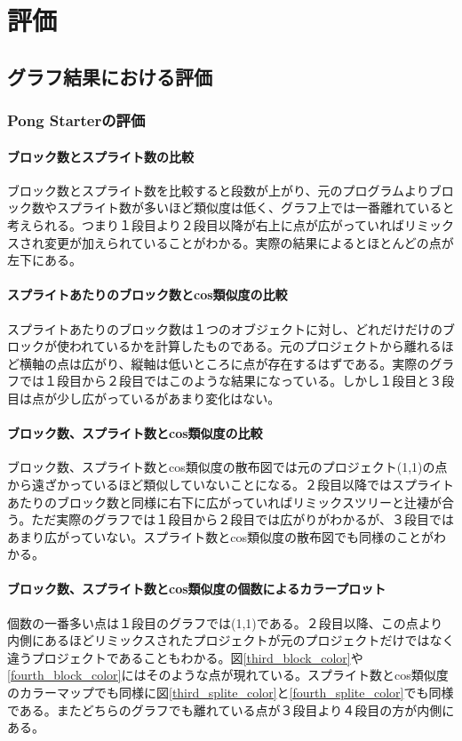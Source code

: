 \documentclass[a4paper,10pt,onecolumn,oneside,openany]{jsbook}
\begin{document}
 




\chapter{評価}

\section{グラフ結果における評価}
\subsection{Pong Starterの評価}
\subsubsection{ブロック数とスプライト数の比較}
ブロック数とスプライト数を比較すると段数が上がり、元のプログラムよりブロック数やスプライト数が多いほど類似度は低く、グラフ上では一番離れていると考えられる。つまり１段目より２段目以降が右上に点が広がっていればリミックスされ変更が加えられていることがわかる。実際の結果によるとほとんどの点が左下にある。

\subsubsection{スプライトあたりのブロック数とcos類似度の比較}
スプライトあたりのブロック数は１つのオブジェクトに対し、どれだけだけのブロックが使われているかを計算したものである。元のプロジェクトから離れるほど横軸の点は広がり、縦軸は低いところに点が存在するはずである。実際のグラフでは１段目から２段目ではこのような結果になっている。しかし１段目と３段目は点が少し広がっているがあまり変化はない。

\subsubsection{ブロック数、スプライト数とcos類似度の比較}
ブロック数、スプライト数とcos類似度の散布図では元のプロジェクト(1,1)の点から遠ざかっているほど類似していないことになる。２段目以降ではスプライトあたりのブロック数と同様に右下に広がっていればリミックスツリーと辻褄が合う。ただ実際のグラフでは１段目から２段目では広がりがわかるが、３段目ではあまり広がっていない。スプライト数とcos類似度の散布図でも同様のことがわかる。

\subsubsection{ブロック数、スプライト数とcos類似度の個数によるカラープロット}
個数の一番多い点は１段目のグラフでは(1,1)である。２段目以降、この点より内側にあるほどリミックスされたプロジェクトが元のプロジェクトだけではなく違うプロジェクトであることもわかる。図\ref{third_block_color}や\ref{fourth_block_color}にはそのような点が現れている。スプライト数とcos類似度のカラーマップでも同様に図\ref{third_splite_color}と\ref{fourth_splite_color}でも同様である。またどちらのグラフでも離れている点が３段目より４段目の方が内側にある。
\end{document}

